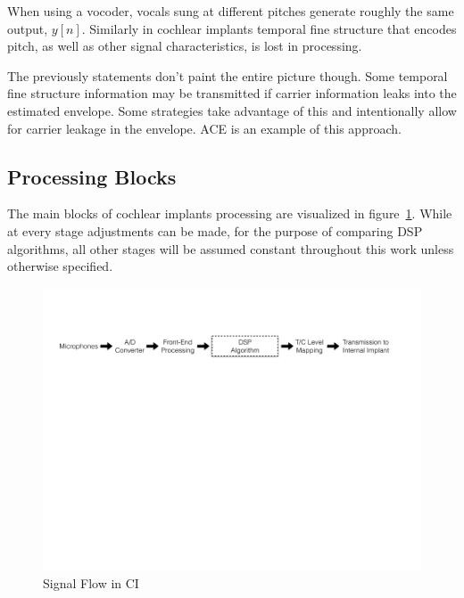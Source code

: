 \documentclass [11pt, proquest,oneside] {ganter_thesis}[2015/03/03]
\begin{document}
When using a vocoder, vocals sung at different pitches generate roughly the same output, $y[n]$.  Similarly in cochlear implants temporal fine structure that encodes pitch, as well as other signal characteristics, is lost in processing.

The previously statements don't paint the entire picture though.  Some temporal fine structure information may be transmitted if carrier information leaks into the estimated envelope.  Some strategies take advantage of this and intentionally allow for carrier leakage in the envelope.  ACE is an example of this approach.


\subsection{Processing Blocks}

The main blocks of cochlear implants processing are visualized in figure~\ref{fig:CI_signal_flow}.  While at every stage adjustments can be made, for the purpose of comparing DSP algorithms, all other stages will be assumed constant throughout this work unless otherwise specified.

\begin{figure}[!ht]
  \centering
    \includegraphics[width=1\textwidth]{CI_Signal_Flow}   
    \caption{Signal Flow in CI}\label{fig:CI_signal_flow}
\end{figure}
\end{document}
